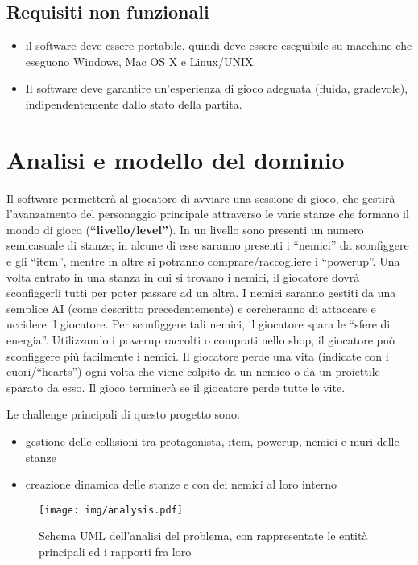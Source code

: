\documentclass[a4paper,12pt]{report}
\begin{document}
\subsection*{Requisiti non funzionali}
\begin{itemize}
    \item il software deve essere portabile, quindi deve essere eseguibile su macchine che eseguono Windows, Mac OS X e Linux/UNIX.
    \item Il software deve garantire un'esperienza di gioco adeguata (fluida, gradevole), indipendentemente dallo stato della partita.
\end{itemize}

\newpage
\section{Analisi e modello del dominio}
Il software permetterà al giocatore di avviare una sessione di gioco, che gestirà l'avanzamento del personaggio principale attraverso le varie stanze che formano il mondo di gioco (\textbf{``livello/level''}).
In un livello sono presenti un numero semicasuale di stanze; in alcune di esse saranno presenti i ``nemici'' da sconfiggere e gli ``item'', mentre in altre si potranno comprare/raccogliere i ``powerup''.
Una volta entrato in una stanza in cui si trovano i nemici, il giocatore dovrà sconfiggerli tutti per poter passare ad un altra.
I nemici saranno gestiti da una semplice AI (come descritto precedentemente) e cercheranno di attaccare e uccidere il giocatore. 
Per sconfiggere tali nemici, il giocatore spara le ``sfere di energia''. Utilizzando i powerup raccolti o comprati nello shop, il giocatore può sconfiggere più facilmente i nemici. 
Il giocatore perde una vita (indicate con i cuori/``hearts'') ogni volta che viene colpito da un nemico o da un proiettile sparato da esso.
Il gioco terminerà se il giocatore perde tutte le vite.

Le challenge principali di questo progetto sono:
\begin{itemize}
    \item gestione delle collisioni tra protagonista, item, powerup, nemici e muri delle stanze
    \item creazione dinamica delle stanze e con dei nemici al loro interno
\end{itemize}

\begin{figure}[H]
\centering{}
\texttt{[image: img/analysis.pdf]}
\caption{Schema UML dell'analisi del problema, con rappresentate le entità principali ed i rapporti fra loro}
\label{img:analysis}
\end{figure}
\end{document}
